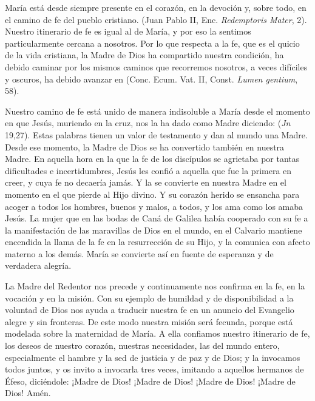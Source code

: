 {María está desde siempre presente en el corazón, en la devoción y, sobre todo, en el camino de fe del pueblo cristiano.  (Juan Pablo II, Enc. \emph{Redemptoris Mater}, 2). Nuestro itinerario de fe es igual al de María, y por eso la sentimos particularmente cercana a nosotros. Por lo que respecta a la fe, que es el quicio de la vida cristiana, la Madre de Dios ha compartido nuestra condición, ha debido caminar por los mismos caminos que recorremos nosotros, a veces difíciles y oscuros, ha debido avanzar en  (Conc. Ecum. Vat. II, Const. \emph{Lumen gentium}, 58).

Nuestro camino de fe está unido de manera indisoluble a María desde el momento en que Jesús, muriendo en la cruz, nos la ha dado como Madre diciendo:  (\emph{Jn} 19,27). Estas palabras tienen un valor de testamento y dan al mundo una Madre. Desde ese momento, la Madre de Dios se ha convertido también en nuestra Madre. En aquella hora en la que la fe de los discípulos se agrietaba por tantas dificultades e incertidumbres, Jesús les confió a aquella que fue la primera en creer, y cuya fe no decaería jamás. Y la  se convierte en nuestra Madre en el momento en el que pierde al Hijo divino. Y su corazón herido se ensancha para acoger a todos los hombres, buenos y malos, a todos, y los ama como los amaba Jesús. La mujer que en las bodas de Caná de Galilea había cooperado con su fe a la manifestación de las maravillas de Dios en el mundo, en el Calvario mantiene encendida la llama de la fe en la resurrección de su Hijo, y la comunica con afecto materno a los demás. María se convierte así en fuente de esperanza y de verdadera alegría.

La Madre del Redentor nos precede y continuamente nos confirma en la fe, en la vocación y en la misión. Con su ejemplo de humildad y de disponibilidad a la voluntad de Dios nos ayuda a traducir nuestra fe en un anuncio del Evangelio alegre y sin fronteras. De este modo nuestra misión será fecunda, porque está modelada sobre la maternidad de María. A ella confiamos nuestro itinerario de fe, los deseos de nuestro corazón, nuestras necesidades, las del mundo entero, especialmente el hambre y la sed de justicia y de paz y de Dios; y la invocamos todos juntos, y os invito a invocarla tres veces, imitando a aquellos hermanos de Éfeso, diciéndole: ¡Madre de Dios! ¡Madre de Dios! ¡Madre de Dios! ¡Madre de Dios! Amén.

}
